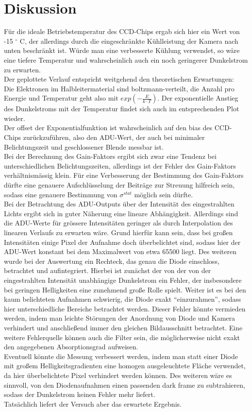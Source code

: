 \section{Diskussion}
Für die ideale Betriebstemperatur des CCD-Chips ergab sich hier ein Wert von -15 $^\circ$ C, der allerdings durch die eingeschränkte Kühlleistung der Kamera nach unten beschränkt ist. Würde man eine verbesserte Kühlung verwendet, so wäre eine tiefere Temperatur und wahrscheinlich auch ein noch geringerer Dunkelstrom zu erwarten. \\
Der geplottete Verlauf entspricht weitgehend den theoretischen Erwartungen: \\
Die Elektronen im Halbleitermaterial sind boltzmann-verteilt, die Anzahl pro Energie und Temperatur geht also mit $exp(-\frac{E}{k \cdot T})$. Der exponentielle Anstieg des Dunkelstroms mit der Temperatur findet sich auch im entsprechenden Plot wieder. \\
Der offset der Exponentialfunktion ist wahrscheinlich auf den bias des CCD-Chips zurückzuführen, also den ADU-Wert, der auch bei minimaler Belichtungszeit und geschlossener Blende messbar ist. \\
Bei der Berechnung des Gain-Faktors ergibt sich zwar eine Tendenz bei unterschiedlichen Belichtungszeiten, allerdings ist der Fehler des Gain-Faktors verhältnismässig klein. Für eine Verbesserung der Bestimmung des Gain-Faktors dürfte eine genauere Aufschlüsselung der Beiträge zur Streuung hilfreich sein, sodass eine genauere Bestimmung von $\sigma^{stat}$ möglich sein dürfte. \\
Bei der Betrachtung des ADU-Outputs über der Intensität des eingestrahlten Lichts ergibt sich in guter Näherung eine lineare Abhängigkeit. Allerdings sind die ADU-Werte für grössere Intensitäten geringer als durch Interpolation des linearen Verlaufs zu erwarten wäre. Grund hierfür kann sein, dass bei großen Intensitäten einige Pixel der Aufnahme doch überbelichtet sind, sodass hier der ADU-Wert konstant bei dem Maximalwert von etwa 65500 liegt. Des weiteren wurde bei der Auswertung ein Rechteck, das genau die Diode einschloss, betrachtet und aufintegriert. Hierbei ist zunächst der von der von der eingestrahlten Intensität unabhängige Dunkelstrom ein Fehler, der insbesondere bei geringen Helligkeiten eine zunehmend große Rolle spielt. Weiter ist es bei den kaum belichteten Aufnahmen schwierig, die Diode exakt \enquote{einzurahmen}, sodass hier unterschiedliche Bereiche betrachtet werden. Dieser Fehler könnte vermieden werden, indem man leichte Störungen der Anordnung von Diode und Kamera verhindert und anschließend immer den gleichen Bildausschnitt betrachtet. Eine weitere Fehlerquelle können auch die Filter sein, die möglicherweise nicht exakt den angegebenen Absorptionsgrad aufweisen. \\
Eventuell könnte die Messung verbessert werden, indem man statt einer Diode mit großem Helligkeitsgradienten eine homogen ausgeleuchtete Fläche verwendet, da hier überbelichtete Pixel verhindert werden können. Des weiteren wäre es sinnvoll, von den Diodenaufnahmen einen passenden dark frame zu subtrahieren, sodass der Dunkelstrom keinen Fehler mehr liefert. \\
Tatsächlich liefert der Versuch aber das erwartete Ergebnis. 